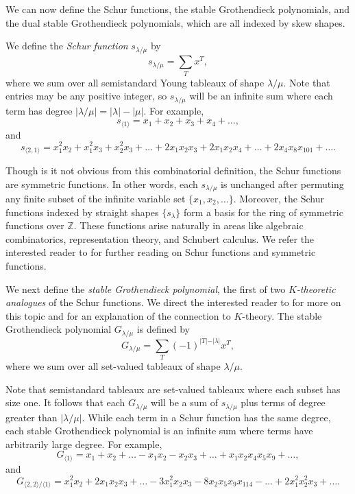 \documentclass[12pt]{amsart}
\theoremstyle{definition}
\newcommand{\Becky}[1]{\todo[size=\tiny,inline,color=blue!30]{#1
      \\ \hfill --- B.}}
\begin{document}
We can now define the Schur functions, the stable Grothendieck polynomials, and the dual stable Grothendieck polynomials, which are all indexed by skew shapes.

We define the \textit{Schur function} $s_{\lambda / \mu}$ by
$$s_{\lambda / \mu} = \sum_{T}^{}x^T,$$
where we sum over all semistandard Young tableaux of shape $\lambda / \mu$. Note that entries may be any positive integer, so $s_{\lambda/\mu}$ will be an infinite sum where each term has degree $|\lambda/\mu|=|\lambda|-|\mu|$. For example, 
\[s_{\langle 1 \rangle}=x_1+x_2+x_3+x_4+\ldots,\] and 
\[s_{\langle 2,1\rangle}=x_1^2x_2+x_1^2x_3+x_2^2x_3+\ldots + 2x_1x_2x_3+2x_1x_2x_4+\ldots+2x_4x_8x_{101}+\ldots.\]

Though is it not obvious from this combinatorial definition, the Schur functions are symmetric functions. In other words, each $s_{\lambda/\mu}$ is unchanged after permuting any finite subset of the infinite variable set $\{x_1,x_2,\ldots\}$. Moreover, the Schur functions indexed by straight shapes $\{s_\lambda\}$ form a basis for the ring of symmetric functions over $\mathbb{Z}$. These functions arise naturally in areas like algebraic combinatorics, representation theory, and Schubert calculus. We refer the interested reader to \cite{EC2} for further reading on Schur functions and symmetric functions.  

We next define the \textit{stable Grothendieck polynomial}, the first of two \textit{$K$-theoretic analogues} of the Schur functions. We direct the interested reader to \cite{buch2002lrrule} for more on this topic and for an explanation of the connection to $K$-theory. The stable Grothendieck polynomial $G_{\lambda / \mu}$ is defined by
$$G_{\lambda / \mu} = \sum_{T}^{}(-1)^{\vert T \vert -\vert \lambda \vert}x^T,$$
where we sum over all set-valued tableaux of shape $\lambda / \mu$. 

Note that semistandard tableaux are set-valued tableaux where each subset has size one. It follows that each $G_{\lambda/\mu}$ will be a sum of $s_{\lambda/\mu}$ plus terms of degree greater than $|\lambda/\mu|$. While each term in a Schur function has the same degree, each stable Grothendieck polynomial is an infinite sum where terms have arbitrarily large degree. For example, 
\[G_{\langle 1 \rangle}=x_1+x_2+\ldots -x_1x_2-x_2x_3+\ldots+x_1x_2x_4x_5x_9+\ldots,\] and \[G_{\langle 2,2 \rangle/\langle 1\rangle}=x_1^2x_2+2x_1x_2x_3+\ldots- 3x_1^2x_2x_3-8x_2x_5x_9x_{114}-\ldots+2x_1^2x_2^2x_3+\ldots.\]

\end{document}
